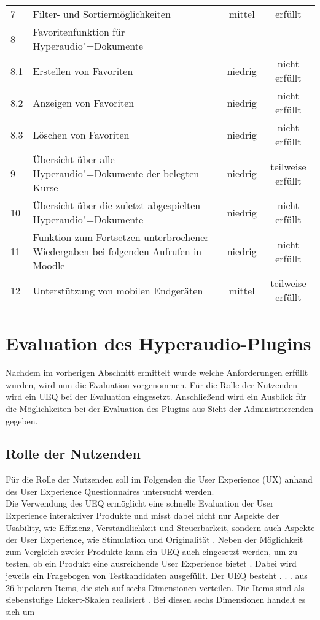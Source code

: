 \begin{table}[!ht]
\begin{tabularx}{\textwidth}{lXcc}
   	7 & Filter- und Sortiermöglichkeiten & mittel & erfüllt\\
    8 & Favoritenfunktion für Hyperaudio"=Dokumente & & \\
    8.1 & \hspace*{0.5cm} Erstellen von Favoriten & niedrig & nicht erfüllt\\
    8.2 & \hspace*{0.5cm} Anzeigen von Favoriten & niedrig & nicht erfüllt\\
    8.3 & \hspace*{0.5cm} Löschen von Favoriten & niedrig & nicht erfüllt\\    
    9 & Übersicht über alle Hyperaudio"=Dokumente der belegten Kurse & niedrig & teilweise erfüllt\\
    10 & Übersicht über die zuletzt abgespielten Hyperaudio"=Dokumente & niedrig & nicht erfüllt\\
    11 &  Funktion zum Fortsetzen unterbrochener Wiedergaben bei folgenden Aufrufen in Moodle & niedrig & nicht erfüllt\\
    12 & Unterstützung von mobilen Endgeräten & mittel & teilweise erfüllt\\
    \hline
\end{tabularx}
\end{table}
\FloatBarrier

\section{Evaluation des Hyperaudio-Plugins}
Nachdem im vorherigen Abschnitt ermittelt wurde welche Anforderungen erfüllt wurden, wird nun die Evaluation vorgenommen. Für die Rolle der Nutzenden wird ein UEQ bei der Evaluation eingesetzt. Anschließend wird ein Ausblick für die Möglichkeiten bei der Evaluation des Plugins aus Sicht der Administrierenden gegeben.

\subsection{Rolle der Nutzenden}
Für die Rolle der Nutzenden soll im Folgenden die User Experience (UX) anhand des User Experience Questionnaires untersucht werden.\\
Die Verwendung des UEQ ermöglicht eine schnelle Evaluation der User Experience interaktiver Produkte und misst dabei nicht nur Aspekte der Usability, wie Effizienz, Verständlichkeit und Steuerbarkeit, sondern auch Aspekte der User Experience, wie Stimulation und Originalität \citep{rauschenberger2013efficient}. Neben der Möglichkeit zum Vergleich zweier Produkte kann ein UEQ auch eingesetzt werden, um zu testen, ob ein Produkt eine ausreichende User Experience bietet \citep{schrepp2018user}. Dabei wird jeweils ein Fragebogen von Testkandidaten ausgefüllt. \glqq Der UEQ besteht . . . aus 26 bipolaren Items, die sich auf sechs Dimensionen verteilen. Die Items sind als siebenstufige Lickert-Skalen realisiert\grqq{} \citep{rauschenberger2013user}. Bei diesen sechs Dimensionen handelt es sich um

